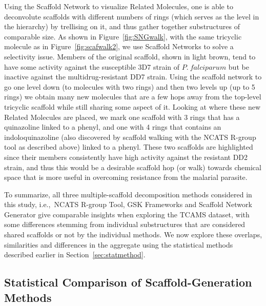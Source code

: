 \documentclass[journal=jacsat,manuscript=article]{achemso}
\newcommand*\fref[1]{Figure~\ref{fig:#1}}
\newcommand*\sref[1]{Section~\ref{sec:#1}}
\newcommand*\ie{i.e.,~}
\begin{document}
Using the Scaffold Network to visualize Related Molecules, one is able to deconvolute scaffolds with different numbers of rings (which serves as the level in the hierarchy) by trellising on it, and thus gather together substructures of comparable size. As shown in \fref{SNGwalk}, with the same tricyclic molecule as in \fref{scafwalk2}, we use Scaffold Networks to solve a selectivity issue. Members of the original scaffold, shown in light brown, tend to have some activity against the susceptible 3D7 strain of $P.~falciparum$ but be inactive against the multidrug-resistant DD7 strain. Using the scaffold network to go one level down (to molecules with two rings) and then two levels up (up to 5 rings) we obtain many new molecules that are a few hops away from the top-level tricyclic scaffold while still sharing some aspect of it. Looking at where these new Related Molecules are placed, we mark one scaffold with 3 rings that has a quinazoline linked to a phenyl, and one with 4 rings that contains an indoloquinazoline (also discovered by scaffold walking with the NCATS R-group tool as described above) linked to a phenyl. These two scaffolds are highlighted since their members consistently have high activity against the resistant DD2 strain, and thus this would be a desirable scaffold hop (or walk) towards chemical space that is more useful in overcoming resistance from the malarial parasite.  

To summarize, all three multiple-scaffold decomposition methods considered in this study, \ie NCATS R-group Tool, GSK Frameworks  and Scaffold Network Generator give comparable insights when exploring the TCAMS dataset, with some differences stemming from individual substructures that are considered shared scaffolds or not by the individual methods.  We now explore these overlaps, similarities and differences in the aggregate using the statistical methods described earlier in \sref{statmethod}.

\subsection{Statistical Comparison of Scaffold-Generation Methods}\label{sec:statcomp}
\end{document}
